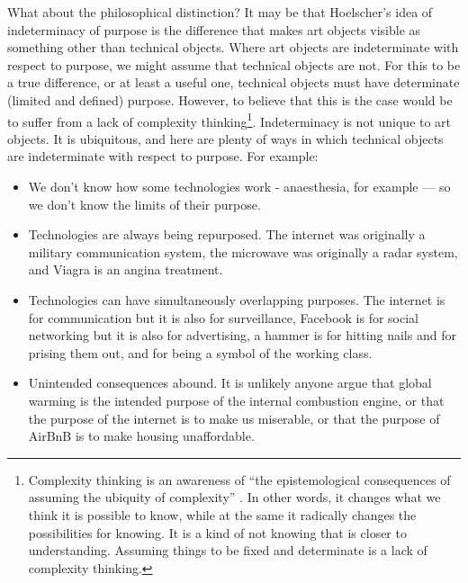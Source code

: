 \documentclass[letterpaper]{article}
\begin{document}
    What about the philosophical distinction? It may be that Hoelscher's idea of indeterminacy of purpose is the difference that makes art objects visible as something other than technical objects. Where art objects are indeterminate with respect to purpose, we might assume that technical objects are not. For this to be a true difference, or at least a useful one, technical objects must have determinate (limited and defined) purpose. However, to believe that this is the case would be to suffer from a lack of complexity thinking\footnote{

        Complexity thinking is an awareness of “the epistemological consequences of assuming the ubiquity of complexity” \citep{CilliersRichardsonCmplxtyScnc2001}. In other words, it changes what we think it is possible to know, while at the same it radically changes the possibilities for knowing. It is a kind of not knowing that is closer to understanding. Assuming things to be fixed and determinate is a lack of complexity thinking.
    
    }. Indeterminacy is not unique to art objects. It is ubiquitous, and here are plenty of ways in which technical objects are indeterminate with respect to purpose. For example:

    \begin{itemize}
     
        \item We don't know how some technologies work - anaesthesia, for example — so we don't know the limits of their purpose.
    
        \item Technologies are always being repurposed. The internet was originally a military communication system, the microwave was originally a radar system, and Viagra is an angina treatment.

        \item Technologies can have simultaneously overlapping purposes. The internet is for communication but it is also for surveillance, Facebook is for social networking but it is also for advertising, a hammer is for hitting nails and for prising them out, and for being a symbol of the working class.

        \item Unintended consequences abound. It is unlikely anyone argue that global warming is the intended purpose of the internal combustion engine, or that the purpose of the internet is to make us miserable, or that the purpose of AirBnB is to make housing unaffordable.
    \end{itemize}
\end{document}
